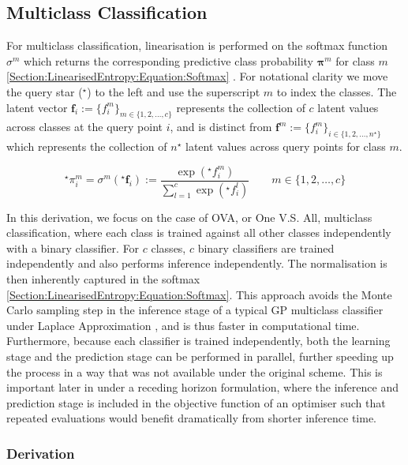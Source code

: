\documentclass{article}
\renewcommand{\vec}[1]{\boldsymbol{#1}}
\begin{document}
	\subsection{Multiclass Classification}
			
		For multiclass classification, linearisation is performed on the softmax function $\sigma^{m}$ which returns the corresponding predictive class probability $\vec{\pi}^{m}$ for class $m$ \eqref{Section:LinearisedEntropy:Equation:Softmax} \cite{GaussianProcessForMachineLearning}. For notational clarity we move the query star ($^\star$) to the left and use the superscript $m$ to index the classes. The latent vector $\vec{f}_{i} := \{f^{m}_{i}\}_{m \in \{1, 2, \dots, c\}}$ represents the collection of $c$ latent values across classes at the query point $i$, and is distinct from $\vec{f}^{m} := \{f^{m}_{i}\}_{i \in \{1, 2, \dots, n^{\star}\}}$ which represents the collection of $n^{\star}$ latent values across query points for class $m$.

		\begin{equation}
			^{\star}\pi^{m}_{i} = \sigma^{m}(^{\star}\vec{f}_{i}) := \frac{\exp(^{\star}f^{m}_{i})}{\sum_{l = 1}^{c} \exp(^{\star}f^{l}_{i})} \qquad m \in \{1, 2, \dots, c\}
		\label{Section:LinearisedEntropy:Equation:Softmax}
		\end{equation}
		
		In this derivation, we focus on the case of OVA, or One V.S. All, multiclass classification, where each class is trained against all other classes independently with a binary classifier. For $c$ classes, $c$ binary classifiers are trained independently and also performs inference independently. The normalisation is then inherently captured in the softmax \eqref{Section:LinearisedEntropy:Equation:Softmax}. This approach avoids the Monte Carlo sampling step in the inference stage of a typical GP multiclass classifier under Laplace Approximation \cite{GaussianProcessForMachineLearning}, and is thus faster in computational time. Furthermore, because each classifier is trained independently, both the learning stage and the prediction stage can be performed in parallel, further speeding up the process in a way that was not available under the original scheme. This is important later in under a receding horizon formulation, where the inference and prediction stage is included in the objective function of an optimiser such that repeated evaluations would benefit dramatically from shorter inference time.
		
		\subsubsection{Derivation}
		
\end{document}
